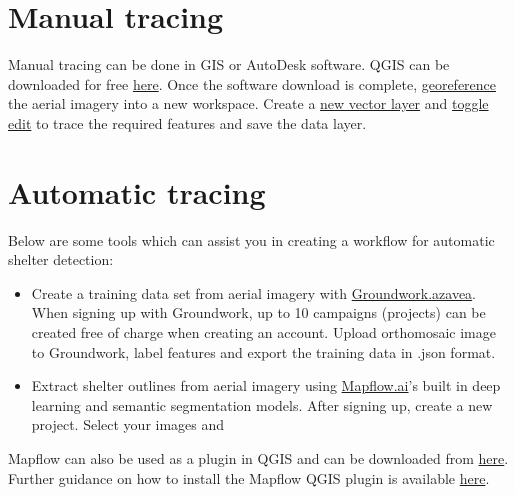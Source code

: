 \documentclass[
  a4paper,
  onecolumn,
  oneside]{book}
\begin{document}
\hypertarget{manual-tracing}{%
\section{Manual tracing}\label{manual-tracing}}

Manual tracing can be done in GIS or AutoDesk software. QGIS can be
downloaded for free
\href{https://www.qgis.org/en/site/forusers/download.html}{here}. Once
the software download is complete,
\href{https://www.qgistutorials.com/en/docs/3/advanced_georeferencing.html}{georeference}
the aerial imagery into a new workspace. Create a
\href{https://docs.qgis.org/3.22/en/docs/training_manual/create_vector_data/create_new_vector.html\#:~:text=Open\%20QGIS\%20and\%20create\%20a,to\%20define\%20a\%20new\%20layer.}{new
vector layer} and
\href{https://docs.qgis.org/2.8/en/docs/user_manual/working_with_vector/editing_geometry_attributes.html\#digitizing-an-existing-layer}{toggle
edit} to trace the required features and save the data layer.

\hypertarget{automatic-tracing}{%
\section{Automatic tracing}\label{automatic-tracing}}

Below are some tools which can assist you in creating a workflow for
automatic shelter detection:

\begin{itemize}
\item
  Create a training data set from aerial imagery with
  \href{https://groundwork.azavea.com/}{Groundwork.azavea}. When signing
  up with Groundwork, up to 10 campaigns (projects) can be created free
  of charge when creating an account. Upload orthomosaic image to
  Groundwork, label features and export the training data in .json
  format.
\item
  Extract shelter outlines from aerial imagery using
  \href{https://mapflow.ai/}{Mapflow.ai}'s built in deep learning and
  semantic segmentation models. After signing up, create a new project.
  Select your images and
\end{itemize}

Mapflow can also be used as a plugin in QGIS and can be downloaded from
\href{https://plugins.qgis.org/plugins/mapflow/}{here}. Further guidance
on how to install the Mapflow QGIS plugin is available
\href{https://docs.mapflow.ai/api/qgis_mapflow\#user-interface}{here}.
\end{document}
